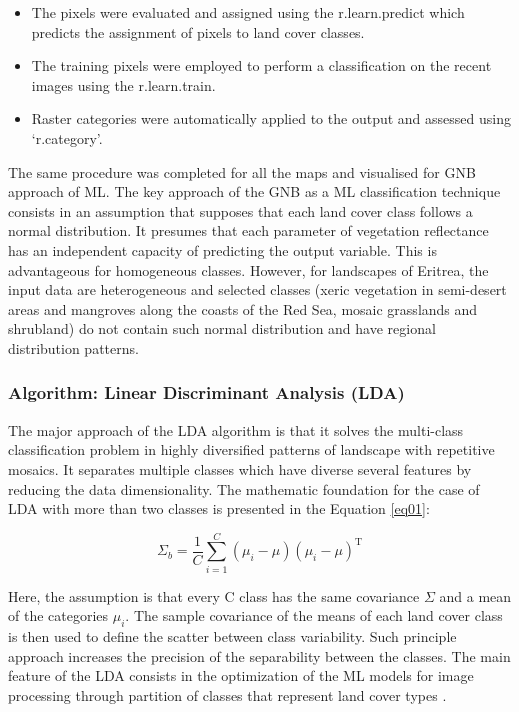 \documentclass[sn-mathphys-num]{sn-jnl}%
\theoremstyle{thmstyleone}%
\theoremstyle{thmstyletwo}%
\theoremstyle{thmstylethree}%
\begin{document}
{\begin{itemize}
\item {The} pixels were evaluated and assigned using the r.learn.predict {which predicts} the {assignment} of pixels to land cover classes.
\item {The} training pixels were employed to perform a classification on the recent images using the {r.learn.train}.
\item Raster categories were automatically applied to the{ }output and assessed using ‘r.category’.
\end{itemize}

The same procedure was completed for all the maps and visualised for GNB approach of ML. The key approach of the GNB as a ML classification technique consists in an assumption that supposes that each land cover class follows a normal distribution. It presumes that each parameter of vegetation reflectance has an independent capacity of predicting the output variable. This is advantageous for homogeneous classes. However, for landscapes of Eritrea, the input data are heterogeneous and selected classes (xeric vegetation in semi-desert areas and mangroves along the coasts of the Red Sea, mosaic grasslands and shrubland) do not contain such normal distribution and have regional distribution patterns.

\subsubsection{Algorithm: Linear Discriminant Analysis (LDA)}

The major approach of the LDA algorithm is that it solves the multi-class classification problem in highly diversified patterns of landscape with repetitive mosaics. It separates multiple classes which have diverse several features by reducing the data dimensionality. {The mathematic foundation for the case of LDA with more than two classes is presented in the Equation} \ref{eq01}:

\begin{equation}\label{eq01}
	\Sigma _{b}={\frac {1}{C}}\sum _{i=1}^{C}(\mu _{i}-\mu )(\mu _{i}-\mu )^{\mathrm {T}}
\end{equation}

{Here, the assumption is that every C class has the same covariance $\Sigma$ and a mean of the categories $\mu _{i}$. The sample covariance of the means of each land cover class is then used to define the scatter between class variability. Such principle approach increases the precision of the separability between the classes.} The main feature of the LDA consists in the optimization of the ML models for image processing through partition of classes that represent land cover types \cite{rs17050854}. 

}
\end{document}
